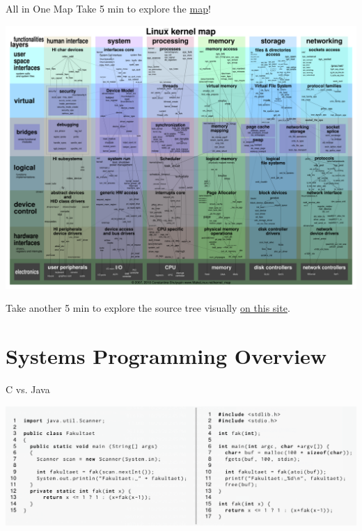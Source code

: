 \documentclass[10pt]{beamer}
\begin{document}
\begin{frame}{All in One Map}
Take 5 min to explore the \href{https://makelinux.github.io/kernel/map/}{map}!
 \begin{center}
      \includegraphics[keepaspectratio, width=\textwidth, height=0.7\textheight-2\baselineskip-2\baselineskip]{img/040_LKM.pdf} \\
 \end{center}
 Take another 5 min to explore the source tree visually \href{https://cregit.linuxsources.org/code/5.8/}{on this site}.
\end{frame}


\section{Systems Programming Overview}
\begin{frame}{C vs. Java}
 \begin{center}
    \includegraphics[keepaspectratio, width=\textwidth, height=\textheight-2\baselineskip-2\baselineskip]{img/300_c_vs_java.png} \\ \framebreak
 \end{center}

\end{frame}
\end{document}
